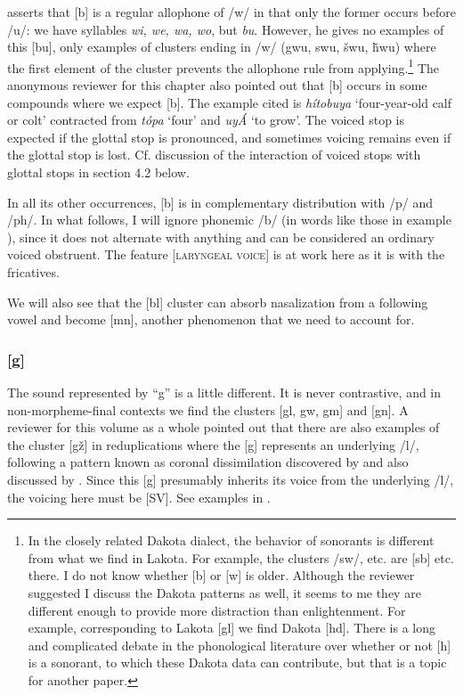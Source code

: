 \documentclass[output=paper]{LSP/langsci}
\begin{document}
\citet[8]{Rankin2001} asserts that [b] is a regular allophone of /w/ in that only the former occurs before /u/: we have syllables \textit{wi, we, wa, wo}, but \textit{bu}. However, he gives no examples of this [bu], only examples of clusters ending in /w/ (gwu, swu, \v{s}wu, \v{h}wu) where the first element of the cluster prevents the allophone rule from applying.\footnote{In the closely related Dakota dialect, the behavior of sonorants is different from what we find in Lakota. For example, the clusters /sw/, etc. are [sb] etc. there. I do not know whether [b] or [w] is older. Although the reviewer suggested I discuss the Dakota patterns as well, it seems to me they are different enough to provide more distraction than enlightenment. For example, corresponding to Lakota [gl] we find Dakota [hd]. There is a long and complicated debate in the phonological literature over whether or not [h] is a sonorant, to which these Dakota data can contribute, but that is a topic for another paper.} The anonymous reviewer for this chapter also pointed out that [b] occurs in some compounds where we expect [b]. The example cited is \textit{h\'itobuya} `four-year-old calf or colt' contracted from \textit{t\'opa} `four' and \textit{uy\'A} `to grow'. The voiced stop is expected if the glottal stop is pronounced, and sometimes voicing remains even if the glottal stop is lost. Cf. discussion of the interaction of voiced stops with glottal stops in section 4.2 below.

In all its other occurrences, [b] is in complementary distribution with /p/ and /ph/. In what follows, I will ignore phonemic /b/ (in words like those in example ), since it does not alternate with anything and can be considered an ordinary voiced obstruent. The feature [\textsc{laryngeal voice}] is at work here as it is with the fricatives.

We will also see that the [bl] cluster can absorb nasalization from a following vowel and become [mn], another phenomenon that we need to account for.

\subsubsection{[g]} 
The sound represented by ``g'' is a little different. It is never contrastive, and in non-morpheme-final contexts we find the clusters [gl, gw, gm] and [gn]. A reviewer for this volume as a whole pointed out that there are also examples of the cluster [g\v{z}] in reduplications where the [g] represents an underlying /l/, following a pattern known as coronal dissimilation discovered by \citet[225--226]{Carter1974} and also discussed by \citet[338]{Shaw1980}.  Since this [g] presumably inherits its voice from the underlying /l/, the voicing here must be [SV].  See examples in .
 
\end{document}
